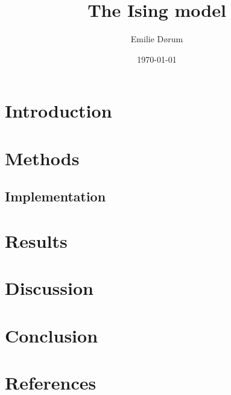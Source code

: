 \documentclass[english,notitlepage,reprint,nofootinbib]{revtex4-2}
\begin{document}
\title{The Ising model}
\author{Emilie Dørum}
\date{\today}
\noaffiliation

\begin{abstract}
\end{abstract}
\maketitle

\newcommand{\dunder}[1] {
	\underline{\underline{#1}} 
}

\newcommand{\mat}[1] {
	\begin{bmatrix}#1\end{bmatrix}
}

\newcommand{\bs}[1] {
	\boldsymbol{#1}
}

\newcommand{\bhat}[1] {
	\hat{\boldsymbol{#1}}
}

\newcommand{\vary}[1] {
	\text{Var}\left[#1\right]
}

\newcommand{\expy}[1] {
	\mathbb{E}\left[#1\right]
}

\newcommand{\avg}[1] {
	\left<#1\right>
}

\section{Introduction}

\section{Methods}

\subsection{Implementation}

\section{Results}

\section{Discussion}

\section{Conclusion}

\onecolumngrid

\section*{References}
\begin{thebibliography}{}
\end{thebibliography}
\end{document}
